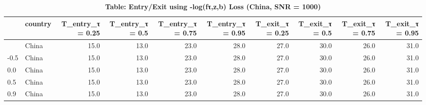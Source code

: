 \begin{table}[t]
\caption*{
{\large \textbf{Table: Entry/Exit using -log(fτ,z,b) Loss (China, SNR = 1000)}}
} 
\begin{tabular*}{\linewidth}{@{\extracolsep{\fill}}l|lrrrrrrrr}
\toprule
 & country & T\_entry\_τ = 0.25 & T\_entry\_τ = 0.5 & T\_entry\_τ = 0.75 & T\_entry\_τ = 0.95 & T\_exit\_τ = 0.25 & T\_exit\_τ = 0.5 & T\_exit\_τ = 0.75 & T\_exit\_τ = 0.95 \\ 
\midrule\addlinespace[2.5pt]
-0.9 & China & 15.0 & 13.0 & 23.0 & 28.0 & 27.0 & 30.0 & 26.0 & 31.0 \\ 
-0.5 & China & 15.0 & 13.0 & 23.0 & 28.0 & 27.0 & 30.0 & 26.0 & 31.0 \\ 
0.0 & China & 15.0 & 13.0 & 23.0 & 28.0 & 27.0 & 30.0 & 26.0 & 31.0 \\ 
0.5 & China & 15.0 & 13.0 & 23.0 & 28.0 & 27.0 & 30.0 & 26.0 & 31.0 \\ 
0.9 & China & 15.0 & 13.0 & 23.0 & 28.0 & 27.0 & 30.0 & 26.0 & 31.0 \\ 
\bottomrule
\end{tabular*}
\end{table}


